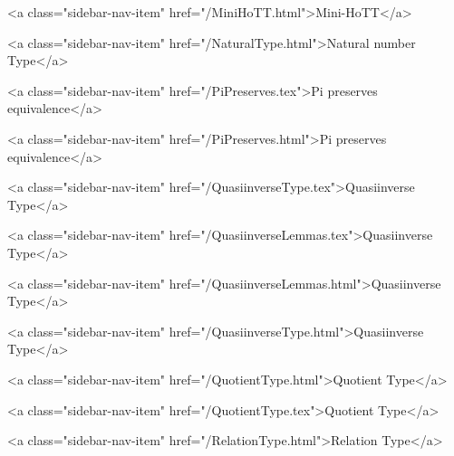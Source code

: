       
        
          <a class="sidebar-nav-item" href="/MiniHoTT.html">Mini-HoTT</a>
        
      
    
      
        
          <a class="sidebar-nav-item" href="/NaturalType.html">Natural number Type</a>
        
      
    
      
        
          <a class="sidebar-nav-item" href="/PiPreserves.tex">Pi preserves equivalence</a>
        
      
    
      
        
          <a class="sidebar-nav-item" href="/PiPreserves.html">Pi preserves equivalence</a>
        
      
    
      
        
          <a class="sidebar-nav-item" href="/QuasiinverseType.tex">Quasiinverse Type</a>
        
      
    
      
        
          <a class="sidebar-nav-item" href="/QuasiinverseLemmas.tex">Quasiinverse Type</a>
        
      
    
      
        
          <a class="sidebar-nav-item" href="/QuasiinverseLemmas.html">Quasiinverse Type</a>
        
      
    
      
        
          <a class="sidebar-nav-item" href="/QuasiinverseType.html">Quasiinverse Type</a>
        
      
    
      
        
          <a class="sidebar-nav-item" href="/QuotientType.html">Quotient Type</a>
        
      
    
      
        
          <a class="sidebar-nav-item" href="/QuotientType.tex">Quotient Type</a>
        
      
    
      
        
          <a class="sidebar-nav-item" href="/RelationType.html">Relation Type</a>
        
